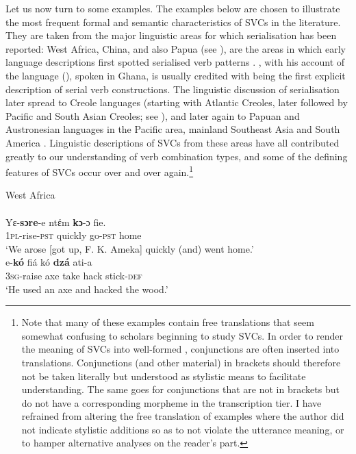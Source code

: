 Let us now turn to some examples. The examples below are chosen to illustrate the most frequent formal and semantic characteristics of SVCs in the literature. They are taken from the major linguistic areas for which serialisation has been reported: West Africa, China, and also Papua (see \citealt[2]{senft2008intro}), are the areas in which early language descriptions first spotted serialised verb patterns \citep{sebba1987syntax, Matthews2006}. \citet{christaller1875}, with his account of the  language (), spoken in Ghana, is usually credited with being the first explicit description of serial verb constructions. The linguistic discussion of serialisation later spread to Creole languages (starting with Atlantic Creoles, later followed by Pacific and South Asian Creoles; see \citealt{nordhoff2012}), and later again to Papuan and Austronesian languages in the Pacific area, mainland Southeast Asia and South America \citep{senft2008event}. Linguistic descriptions of SVCs from these areas have all contributed greatly to our understanding of verb combination types, and some of the defining features of SVCs occur over and over again.\footnote{Note that many of these examples contain free translations that seem somewhat confusing to scholars beginning to study SVCs. In order to render the meaning of SVCs into well-formed , conjunctions are often inserted into translations. Conjunctions (and other material) in brackets should therefore not be taken literally but understood as stylistic means to facilitate understanding. The same goes for conjunctions that are not in brackets but do not have a corresponding morpheme in the transcription tier. I have refrained from altering the free translation of examples where the author did not indicate stylistic additions so as to not violate the utterance meaning, or to hamper alternative analyses on the reader's part.}

\ea \label{Twi0001} 
West Africa\\
\ea \label{Twi01}
\\
\gll Yε-\textbf{sɔre}-e ntέm \textbf{kɔ}-ɔ  fie.\\
\textsc{1}\textsc{pl}-rise-\textsc{pst} quickly go-\textsc{pst} home\\
\glt ‘We arose [got up, F. K. Ameka] quickly (and) went home.’
\ex \label{Ewe01}
\\
\gll e-\textbf{kó} fiá kó \textbf{dzá} ati-a \\
\textsc{3}\textsc{sg}-raise axe take hack stick-\textsc{def}\\
\glt ‘He used an axe and hacked the wood.’
\z
\z

